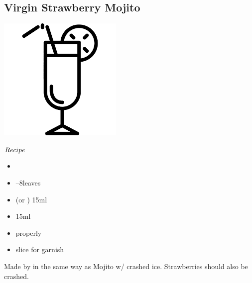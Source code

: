 \subsection{Virgin Strawberry Mojito}
\vspace{-8.mm}
\hspace{68mm}
\includegraphics[scale=.07]{cocktail_glass_tall.png}
\vspace{2.5mm}
\begin{itembox}[l]{\boldmath $Recipe$}
\begin{itemize}
\setlength{\parskip}{0cm}
\setlength{\itemsep}{0cm}
\item {}
\item {}--8leaves
\item \limj (or \lj) 15ml
\item \gumsyrup 15ml
\item \soda properly
\item \lime slice for garnish
\end{itemize}
\vspace{-4mm}
Made by \build in the same way as Mojito w/ crashed ice. Strawberries should also be crashed.
\end{itembox}

